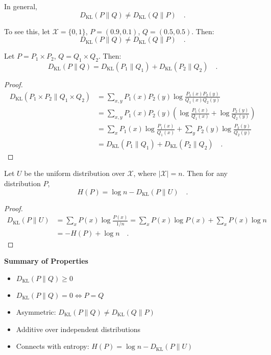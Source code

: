 \documentclass[../../main.tex]{subfiles}
\begin{document}
\begin{remark}[Asymmetry]
    In general,
    \[
        D_{\mathrm{KL}}(P \| Q) \neq D_{\mathrm{KL}}(Q \| P) \quad .
    \]

    To see this, let \( \mathcal{X} = \{0,1\} \), \( P = (0.9, 0.1) \), \( Q = (0.5, 0.5) \). Then:
    \[
        D_{\mathrm{KL}}(P \| Q) \neq D_{\mathrm{KL}}(Q \| P) \quad .
    \]
\end{remark}

\begin{proposition}[Additivity]
    Let \( P = P_1 \times P_2 \), \( Q = Q_1 \times Q_2 \). Then:
    \[
        D_{\mathrm{KL}}(P \| Q) = D_{\mathrm{KL}}(P_1 \| Q_1) + D_{\mathrm{KL}}(P_2 \| Q_2) \quad .
    \]
\end{proposition}
\begin{proof}
    \begin{align*}
        D_{\mathrm{KL}}(P_1 \times P_2 \| Q_1 \times Q_2)
        &= \sum_{x,y} P_1(x)P_2(y) \log \frac{P_1(x)P_2(y)}{Q_1(x)Q_2(y)} \\
        &= \sum_{x,y} P_1(x)P_2(y) \left( \log \frac{P_1(x)}{Q_1(x)} + \log \frac{P_2(y)}{Q_2(y)} \right) \\
        &= \sum_x P_1(x) \log \frac{P_1(x)}{Q_1(x)} + \sum_y P_2(y) \log \frac{P_2(y)}{Q_2(y)} \\
        &= D_{\mathrm{KL}}(P_1 \| Q_1) + D_{\mathrm{KL}}(P_2 \| Q_2) \quad .
    \end{align*}
\end{proof}

\begin{proposition}
    Let \( U \) be the uniform distribution over \( \mathcal{X} \), where \( |\mathcal{X}| = n \). Then for any distribution \( P \),
    \[
        H(P) = \log n - D_{\mathrm{KL}}(P \| U) \quad .
    \]
\end{proposition}
\begin{proof}
    \begin{align*}
        D_{\mathrm{KL}}(P \| U) &= \sum_{x} P(x) \log \frac{P(x)}{1/n}
        = \sum_{x} P(x) \log P(x) + \sum_{x} P(x) \log n \\
        &= -H(P) + \log n \quad .
    \end{align*}
\end{proof}

\textbf{Summary of Properties}

\begin{itemize}[leftmargin=1.2cm]
    \item \( D_{\mathrm{KL}}(P \| Q) \geq 0 \)
    \item \( D_{\mathrm{KL}}(P \| Q) = 0 \iff P = Q \)
    \item Asymmetric: \( D_{\mathrm{KL}}(P \| Q) \neq D_{\mathrm{KL}}(Q \| P) \)
    \item Additive over independent distributions
    \item Connects with entropy: \( H(P) = \log n - D_{\mathrm{KL}}(P \| U) \)
\end{itemize}
\end{document}
